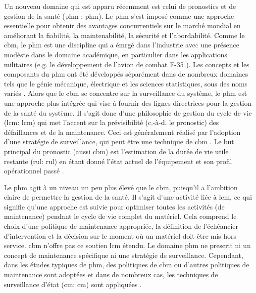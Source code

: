 Un nouveau domaine qui est apparu récemment est celui de pronostics et de gestion de la santé (\acrlong{phm} : \acrshort{phm}). Le \acrshort{phm} s’est imposé comme une approche essentielle pour obtenir des avantages concurrentiels sur le marché mondial en améliorant la fiabilité, la maintenabilité, la sécurité et l’abordabilité. Comme le \acrshort{cbm}, le \acrshort{phm} est une discipline qui a émrgé dans l'industrie avec une présence modèste dans le domaine académique, en particulier dans les applications militaires \cite{Tinga2014} (e.g. le développement de l'avion de combat F-35 \cite{Brown2007}).
Les concepts et les composants du \acrshort{phm} ont été développés séparément dans de nombreux domaines tels que le génie mécanique, électrique et les sciences statistiques, sous des noms variés \cite{Tsui2015}. Alors que le \acrshort{cbm} se concentre sur la surveillance du système, le \acrshort{phm} est une approche plus intégrée qui vise à fournir des lignes directrices pour la gestion de la santé du système. Il s’agit donc d’une philosophie de gestion du cycle de vie (\acrlong{lcm}: \acrshort{lcm}) qui met l’accent sur la prévisibilité (c.-à-d. le pronostic) des défaillances et de la maintenance. Ceci est généralement réalisé par l’adoption d’une stratégie de surveillance, qui peut être une technique de \acrshort{cbm} \cite{Tinga2014}. Le but principal du pronostic (aussi \acrshort{cbm}) est l'estimation de la durée de vie utile restante (\acrlong{rul}: \acrshort{rul}) en étant donné l'état actuel de l'équipement et son profil opérationnel passé \cite{Jardine2006}.

Le \acrshort{phm} agit à un niveau un peu plus élevé que le \acrshort{cbm}, puisqu’il a l’ambition claire de permettre la gestion de la santé. Il s’agit d’une activité liée à \acrshort{lcm}, ce qui signifie qu’une approche est suivie pour optimiser toutes les activités (de maintenance) pendant le cycle de vie complet du matériel. Cela comprend le choix d’une politique de maintenance appropriée, la définition de l'échéancier d'intervention et la décision sur le moment où un matériel doit être mis hors service. \acrshort{cbm} n’offre pas ce soutien \acrshort{lcm} étendu. Le domaine \acrshort{phm} ne prescrit ni un concept de maintenance spécifique ni une stratégie de surveillance. Cependant, dans les études typiques de \acrshort{phm}, des politiques de \acrshort{cbm} ou d’autres politiques de maintenance sont adoptées et dans de nombreux cas, les techniques de surveillance d'état (\acrlong{cm}: \acrshort{cm}) sont appliquées \cite{Tinga2014}.

